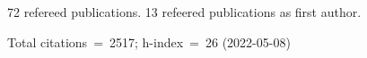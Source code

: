 72 refereed publications. 13 refeered publications as first author.

Total citations~=~2517; h-index~=~26 (2022-05-08)